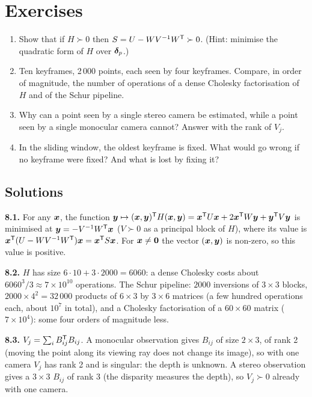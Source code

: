 \FloatBarrier
\section*{Exercises}

\begin{enumerate}[label=\textbf{8.\arabic*},ref=8.\arabic*]
\item\label{ex:8pd} Show that if $H\succ0$ then $S=U-WV^{-1}W^{\mathsf{T}}\succ0$.
  (Hint: minimise the quadratic form of $H$ over $\bm{\delta}_p$.)
\item\label{ex:8cost} Ten keyframes, 2\,000 points, each seen by four
  keyframes. Compare, in order of magnitude, the number of operations of
  a dense Cholesky factorisation of $H$ and of the Schur pipeline.
\item\label{ex:8mono} Why can a point seen by a single stereo camera be
  estimated, while a point seen by a single monocular camera cannot?
  Answer with the rank of $V_j$.
\item\label{ex:8window} In the sliding window, the oldest keyframe is
  fixed. What would go wrong if no keyframe were fixed? And what is lost
  by fixing it?
\end{enumerate}

\subsection*{Solutions}

\textbf{8.1.} For any $\bm{x}$, the function $\bm{y}\mapsto(\bm{x},
\bm{y})^{\mathsf{T}} H(\bm{x},\bm{y})=\bm{x}^{\mathsf{T}} U\bm{x}+2\bm{x}^{\mathsf{T}} W
\bm{y}+\bm{y}^{\mathsf{T}} V\bm{y}$ is minimised at $\bm{y}=-V^{-1}W^{\mathsf{T}}
\bm{x}$ ($V\succ0$ as a principal block of $H$), where its value is
$\bm{x}^{\mathsf{T}}(U-WV^{-1}W^{\mathsf{T}})\bm{x}=\bm{x}^{\mathsf{T}} S\bm{x}$. For
$\bm{x}\neq\bm{0}$ the vector $(\bm{x},\bm{y})$ is non-zero, so
this value is positive.

\textbf{8.2.} $H$ has size $6\cdot10+3\cdot2000=6060$: a dense Cholesky
costs about $6060^3/3\approx7\times10^{10}$ operations. The Schur
pipeline: $2000$ inversions of $3\times3$ blocks, $2000\times4^2=
32\,000$ products of $6\times3$ by $3\times6$ matrices (a few hundred
operations each, about $10^7$ in total), and a Cholesky factorisation of
a $60\times60$ matrix ($7\times10^4$): some four orders of magnitude
less.

\textbf{8.3.} $V_j=\sum_iB_{ij}^{\mathsf{T}} B_{ij}$. A monocular observation
gives $B_{ij}$ of size $2\times3$, of rank 2 (moving the point along its
viewing ray does not change its image), so with one camera $V_j$ has
rank 2 and is singular: the depth is unknown. A stereo observation gives
a $3\times3$ $B_{ij}$ of rank 3 (the disparity measures the depth), so
$V_j\succ0$ already with one camera.

